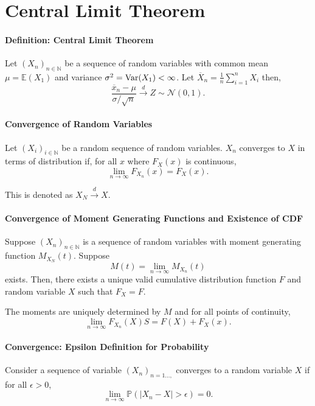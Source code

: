 \section{Central Limit Theorem}

\paragraph{Definition: Central Limit Theorem}
Let \( (X_n)_{n \in  \mathbb{N}} \) be a sequence of random variables
with common mean  \( \mu = \mathbb{E}(X_1)  \) and variance
\( \sigma^2 = \mathrm{Var}(X_1) < \infty\).
Let \( \overline{X}_n = \frac{1}{n} \sum_{i=1}^n X_i \) then, \[
    \frac{\overline{x}_n - \mu}{\sigma / \sqrt{ n }}
    \xrightarrow{d}  Z \sim \mathcal{N}(0, 1)
.\]

\paragraph{Convergence of Random Variables}
Let \( (X_i)_{i \in  \mathbb{N}} \) be a random sequence of random variables.
\( X_n \) converges to  \( X \) in terms of distribution if,
for all \( x \) where  \( F_X(x) \) is continuous,  \[
    \lim_{n \to  \infty} F_{X_n}(x) = F_X(x)
.\]

This is denoted as \( X_N \xrightarrow{d} X \).

\paragraph{Convergence of Moment Generating Functions and Existence of CDF}
Suppose \( (X_n)_{n \in  \mathbb{N}} \) is a sequence of random variables with
moment generating function  \( M_{X_N}(t) \).
Suppose  \[
    M(t) = \lim_{n \to \infty} M_{X_n}(t)
\]
exists.
Then, there exists a unique valid cumulative distribution function
\( F \)  and random variable  \( X \) such that
 \( F_X = F \).

The moments are uniquely determined by \( M \) and for all
points of continuity,  \[
    \lim_{n \to  \infty} F_{X_n} (X)S = F(X) + F_X(x)
.\]

\paragraph{Convergence: Epsilon Definition for Probability}
Consider a sequence of variable \( (X_n)_{n=1 \ldots,} \) converges
to a random variable \( X \) if for all  \( \epsilon > 0 \), \[
    \lim_{n \to \infty} \mathbb{P}( |X_n - X| > \epsilon ) = 0
.\]

